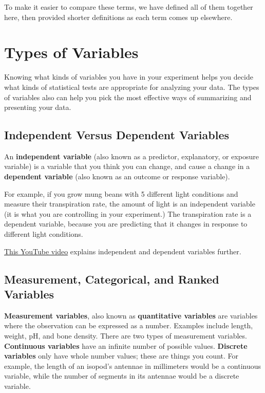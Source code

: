 \documentclass[
]{book}
\begin{document}
To make it easier to compare these terms, we have defined all of them together here, then provided shorter definitions as each term comes up elsewhere.

\hypertarget{types-of-variables}{%
\section{Types of Variables}\label{types-of-variables}}

Knowing what kinds of variables you have in your experiment helps you decide what kinds of statistical tests are appropriate for analyzing your data. The types of variables also can help you pick the most effective ways of summarizing and presenting your data.

\hypertarget{independent-versus-dependent-variables}{%
\subsection{Independent Versus Dependent Variables}\label{independent-versus-dependent-variables}}

An \textbf{independent variable} (also known as a predictor, explanatory, or exposure variable) is a variable that you think you can change, and cause a change in a \textbf{dependent variable} (also known as an outcome or response variable).

For example, if you grow mung beans with 5 different light conditions and measure their transpiration rate, the amount of light is an independent variable (it is what you are controlling in your experiment.) The transpiration rate is a dependent variable, because you are predicting that it changes in response to different light conditions.

\href{https://youtu.be/s-fVRJyEvS0}{This YouTube video} explains independent and dependent variables further.

\hypertarget{measurement-categorical-and-ranked-variables}{%
\subsection{Measurement, Categorical, and Ranked Variables}\label{measurement-categorical-and-ranked-variables}}

\textbf{Measurement variables}, also known as \textbf{quantitative variables} are variables where the observation can be expressed as a number. Examples include length, weight, pH, and bone density. There are two types of measurement variables. \textbf{Continuous variables} have an infinite number of possible values. \textbf{Discrete variables} only have whole number values; these are things you count. For example, the length of an isopod's antennae in millimeters would be a continuous variable, while the number of segments in its antennae would be a discrete variable.
\end{document}
